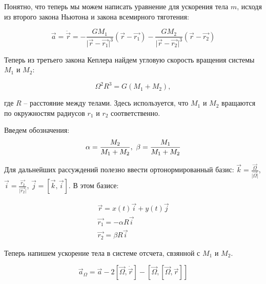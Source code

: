 \documentclass[12pt]{article}
\begin{document}
    Понятно, что теперь мы можем написать уравнение для ускорения тела $m$, 
    исходя из второго закона Ньютона и закона всемирного тяготения:
    
    \begin{equation}
        \vec{a} = \ddot{\vec{r}} = -\frac{GM_1}{\lvert \vec{r} - \vec{r_1} \rvert^3}
        (\vec{r} - \vec{r_1}) - \frac{GM_2}{\lvert \vec{r} - \vec{r_2} \rvert^3}
        (\vec{r} - \vec{r_2}) 
        \label{acceleration}
    \end{equation}

    \par Теперь из третьего закона Кеплера \cite{sivykhin} найдем угловую 
    скорость вращения системы $M_1$ и $M_2$:

    \begin{equation}
        \Omega^2 R^3 = G(M_1 + M_2), 
        \label{kepler}
    \end{equation}

    где $R$ -- расстояние между телами. Здесь используется, что $M_1$ и $M_2$ вращаются
    по окружностям радиусов $r_1$ и $r_2$ соответственно.

    \par Введем обозначения:
    \begin{equation}
        \alpha = \frac{M_2}{M_1 + M_2},\\\ \beta = \frac{M_1}{M_1 + M_2}
        \label{alpha_delta}
    \end{equation}

    \par Для дальнейших рассуждений полезно ввести ортонормированный
    базис: $\vec{k} = \frac{\vec{\Omega}}{\lvert \vec{\Omega} \rvert}$, 
    $\vec{i} = \frac{\vec{r_2}}{\lvert \vec{r_2} \rvert}$, $\vec{j} =
    [ \vec{k}, \vec{i} ]$. В этом базисе:

    \begin{eqnarray*}
        \vec{r}   = x(t)\vec{i} + y(t)\vec{j}\\
        \vec{r_1} = -\alpha R\vec{i}\\
        \vec{r_2} = \beta R\vec{i}
    \end{eqnarray*}

    Теперь напишем ускорение тела в системе отсчета, свзянной с $M_1$ и $M_2$.
    
    \begin{equation}
        \vec{a}_{\Omega} = \vec{a} - 2[\vec{\Omega}, \dot{\vec{r}}] - 
                            [\vec{\Omega}, [\vec{\Omega}, \vec{r}]]
        \label{a_omega}
    \end{equation}
\end{document}
